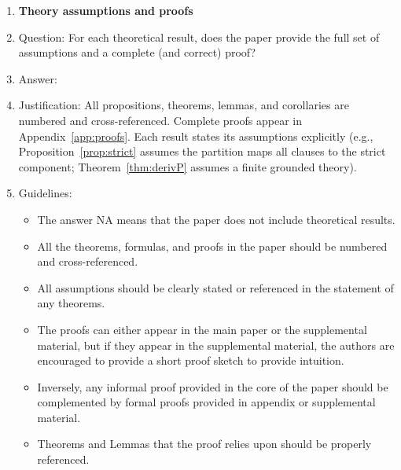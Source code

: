 \documentclass{article}
\theoremstyle{definition}
\begin{document}
\begin{enumerate}
\begin{itemize}
        \item If applicable, the authors should discuss possible limitations of their approach to address problems of privacy and fairness.
        \item While the authors might fear that complete honesty about limitations might be used by reviewers as grounds for rejection, a worse outcome might be that reviewers discover limitations that aren't acknowledged in the paper. The authors should use their best judgment and recognize that individual actions in favor of transparency play an important role in developing norms that preserve the integrity of the community. Reviewers will be specifically instructed to not penalize honesty concerning limitations.
    \end{itemize}

\item {\bf Theory assumptions and proofs}
    \item[] Question: For each theoretical result, does the paper provide the full set of assumptions and a complete (and correct) proof?
    \item[] Answer: \answerYes{}
    \item[] Justification: All propositions, theorems, lemmas, and corollaries are numbered and cross-referenced. Complete proofs appear in Appendix~\ref{app:proofs}. Each result states its assumptions explicitly (e.g., Proposition~\ref{prop:strict} assumes the partition maps all clauses to the strict component; Theorem~\ref{thm:derivP} assumes a finite grounded theory).
    \item[] Guidelines:
    \begin{itemize}
        \item The answer NA means that the paper does not include theoretical results. 
        \item All the theorems, formulas, and proofs in the paper should be numbered and cross-referenced.
        \item All assumptions should be clearly stated or referenced in the statement of any theorems.
        \item The proofs can either appear in the main paper or the supplemental material, but if they appear in the supplemental material, the authors are encouraged to provide a short proof sketch to provide intuition. 
        \item Inversely, any informal proof provided in the core of the paper should be complemented by formal proofs provided in appendix or supplemental material.
        \item Theorems and Lemmas that the proof relies upon should be properly referenced. 
    \end{itemize}


\end{enumerate}
\end{document}
